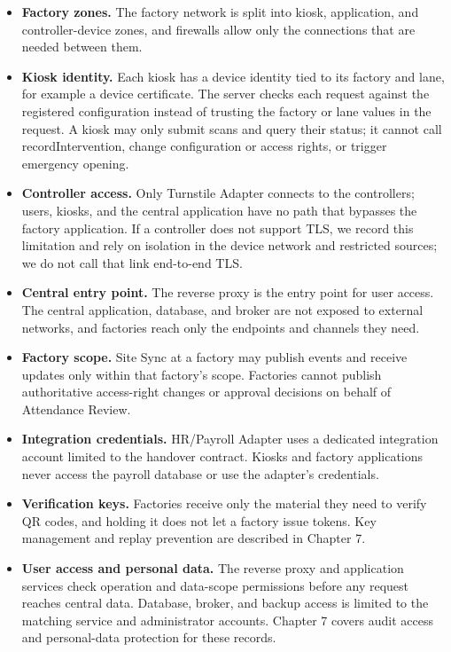 \begin{itemize}[leftmargin=36pt, itemsep=2pt, topsep=4pt, parsep=2pt]
  \item \textbf{Factory zones.} The factory network is split into kiosk, application, and controller-device zones, and firewalls allow only the connections that are needed between them.
  \item \textbf{Kiosk identity.} Each kiosk has a device identity tied to its factory and lane, for example a device certificate. The server checks each request against the registered configuration instead of trusting the factory or lane values in the request. A kiosk may only submit scans and query their status; it cannot call recordIntervention, change configuration or access rights, or trigger emergency opening.
  \item \textbf{Controller access.} Only Turnstile Adapter connects to the controllers; users, kiosks, and the central application have no path that bypasses the factory application. If a controller does not support TLS, we record this limitation and rely on isolation in the device network and restricted sources; we do not call that link end-to-end TLS.
  \item \textbf{Central entry point.} The reverse proxy is the entry point for user access. The central application, database, and broker are not exposed to external networks, and factories reach only the endpoints and channels they need.
  \item \textbf{Factory scope.} Site Sync at a factory may publish events and receive updates only within that factory's scope. Factories cannot publish authoritative access-right changes or approval decisions on behalf of Attendance Review.
  \item \textbf{Integration credentials.} HR/Payroll Adapter uses a dedicated integration account limited to the handover contract. Kiosks and factory applications never access the payroll database or use the adapter's credentials.
  \item \textbf{Verification keys.} Factories receive only the material they need to verify QR codes, and holding it does not let a factory issue tokens. Key management and replay prevention are described in Chapter 7.
  \item \textbf{User access and personal data.} The reverse proxy and application services check operation and data-scope permissions before any request reaches central data. Database, broker, and backup access is limited to the matching service and administrator accounts. Chapter 7 covers audit access and personal-data protection for these records.
\end{itemize}

